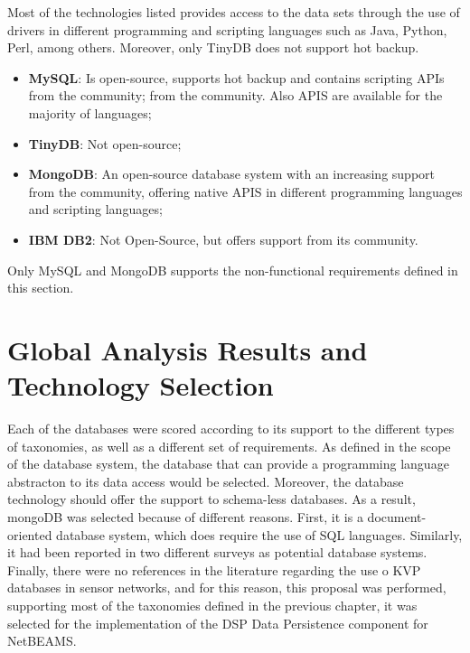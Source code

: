Most of the technologies listed provides access to the data sets through the
use of drivers in different programming and scripting languages such as Java,
Python, Perl, among others. Moreover, only TinyDB does not support hot backup.

\begin{itemize}
  \item \textbf{MySQL}: Is  open-source, supports hot backup and contains
  scripting APIs from  the community;
  from the community. Also APIS are available for the majority of languages;
  \item \textbf{TinyDB}: Not open-source;
  \item \textbf{MongoDB}: An open-source database system with an increasing
  support from  the community, offering native APIS in different programming
  languages and scripting languages;
  \item \textbf{IBM DB2}: Not Open-Source, but offers support from its
  community.
\end{itemize}

Only MySQL and MongoDB supports the non-functional requirements defined in this
section.

\section{Global Analysis Results and Technology Selection}

Each of the databases were scored according to its support to the different
types of taxonomies, as well as a different set of requirements. As defined
in the scope of the database system, the database that can provide a
programming language abstracton to its data access would be selected.
Moreover, the database technology should offer the support to schema-less
databases. As a result, mongoDB was selected because of different reasons.
First, it is a document-oriented database system, which does require the use of
SQL languages. Similarly, it had been reported in two different surveys as
potential database systems. Finally, there were no references in the literature
regarding the use o KVP databases in sensor networks, and for this reason, this
proposal was performed, supporting most of the taxonomies defined in the
previous chapter, it was selected for the implementation of the DSP Data
Persistence component for NetBEAMS.

